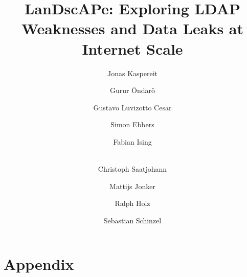 %

\date{}

\title{\Large \bf LanDscAPe: Exploring LDAP Weaknesses and Data Leaks at Internet Scale}
\setlength{\affilsep}{2em}

\author[1]{\rm Jonas Kaspereit}
\author[1]{\rm Gurur Öndarö}
\author[2]{\rm Gustavo Luvizotto Cesar}
\author[1]{\rm Simon Ebbers}
\author[3,4]{\rm Fabian Ising}
\author[1,3,4]{\\\rm Christoph Saatjohann}
\author[2]{\rm Mattijs Jonker}
\author[2,5]{\rm Ralph Holz}
\author[1,3,4]{\rm Sebastian Schinzel}

\maketitle
{}

% 









%







\appendix
\section*{Appendix} 




